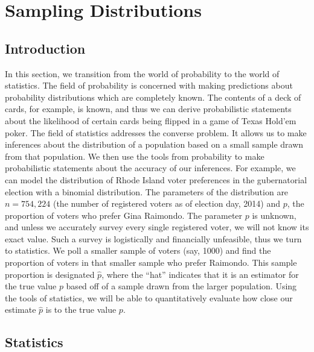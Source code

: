 \documentclass[12pt]{article}
\theoremstyle{definition}
\theoremstyle{remark}
\begin{document}
\setcounter{section}{4}
\section{Sampling Distributions}

\subsection{Introduction}

In this section, we transition from the world of probability to the world of statistics. The field of probability is concerned with making predictions about probability distributions which are completely known. The contents of a deck of cards, for example, is known, and thus we can derive probabilistic statements about the likelihood of certain cards being flipped in a game of Texas Hold'em poker. The field of statistics addresses the converse problem. It allows us to make inferences about the distribution of a population based on a small sample drawn from that population. We then use the tools from probability to make probabilistic statements about the accuracy of our inferences. For example, we can model the distribution of Rhode Island voter preferences in the gubernatorial election with a binomial distribution. The parameters of the distribution are $n = 754,224$ (the number of registered voters as of election day, 2014) and $p$, the proportion of voters who prefer Gina Raimondo. The parameter $p$ is unknown, and unless we accurately survey every single registered voter, we will not know its exact value. Such a survey is logistically and financially unfeasible, thus we turn to statistics. We poll a smaller sample of voters (say, 1000) and find the proportion of voters in that smaller sample who prefer Raimondo. This sample proportion is designated $\hat{p}$, where the ``hat'' indicates that it is an estimator for the true value $p$ based off of a sample drawn from the larger population. Using the tools of statistics, we will be able to quantitatively evaluate how close our estimate $\hat{p}$ is to the true value $p$.\\

\subsection{Statistics}
\end{document}
